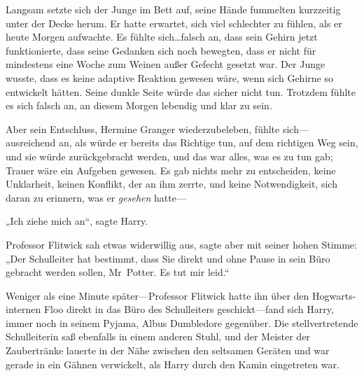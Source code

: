 Langsam setzte sich der Junge im Bett auf, seine Hände fummelten kurzzeitig unter der Decke herum. Er hatte erwartet, sich viel schlechter zu fühlen, als er heute Morgen aufwachte. Es fühlte sich…falsch an, dass sein Gehirn jetzt funktionierte, dass seine Gedanken sich noch bewegten, dass er nicht für mindestens eine Woche zum Weinen außer Gefecht gesetzt war. Der Junge wusste, dass es keine adaptive Reaktion gewesen wäre, wenn sich Gehirne so entwickelt hätten. Seine dunkle Seite würde das sicher nicht tun. Trotzdem fühlte es sich falsch an, an diesem Morgen lebendig und klar zu sein.

Aber sein Entschluss, Hermine Granger wiederzubeleben, fühlte sich—ausreichend an, als würde er bereits das Richtige tun, auf dem richtigen Weg sein, und sie würde zurückgebracht werden, und das war alles, was es zu tun gab; Trauer wäre ein Aufgeben gewesen. Es gab nichts mehr zu entscheiden, keine Unklarheit, keinen Konflikt, der an ihm zerrte, und keine Notwendigkeit, sich daran zu erinnern, was er \emph{gesehen} hatte—

„Ich ziehe mich an“, sagte Harry.

Professor Flitwick sah etwas widerwillig aus, sagte aber mit seiner hohen Stimme: „Der Schulleiter hat bestimmt, dass Sie direkt und ohne Pause in sein Büro gebracht werden sollen, Mr~Potter. Es tut mir leid.“

Weniger als eine Minute später—Professor Flitwick hatte ihn über den Hogwarts-internen Floo direkt in das Büro des Schulleiters geschickt—fand sich Harry, immer noch in seinem Pyjama, Albus Dumbledore gegenüber. Die stellvertretende Schulleiterin saß ebenfalls in einem anderen Stuhl, und der Meister der Zaubertränke lauerte in der Nähe zwischen den seltsamen Geräten und war gerade in ein Gähnen verwickelt, als Harry durch den Kamin eingetreten war.

